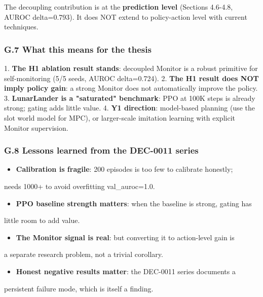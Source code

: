 \documentclass[11pt]{article}
\begin{document}
The decoupling contribution is at the \textbf{prediction level} (Sections 4.6-4.8,
AUROC delta=0.793). It does NOT extend to policy-action level with current
techniques.

\subsubsection{G.7 What this means for the thesis}

1. \textbf{The H1 ablation result stands}: decoupled Monitor is a robust primitive
   for self-monitoring (5/5 seeds, AUROC delta=0.724).
2. \textbf{The H1 result does NOT imply policy gain}: a strong Monitor does not
   automatically improve the policy.
3. \textbf{LunarLander is a "saturated" benchmark}: PPO at 100K steps is already
   strong; gating adds little value.
4. \textbf{Y1 direction}: model-based planning (use the slot world model for MPC),
   or larger-scale imitation learning with explicit Monitor supervision.

\subsubsection{G.8 Lessons learned from the DEC-0011 series}

\begin{itemize}
  \item \textbf{Calibration is fragile}: 200 episodes is too few to calibrate honestly;
\end{itemize}

  needs 1000+ to avoid overfitting val\_auroc=1.0.
\begin{itemize}
  \item \textbf{PPO baseline strength matters}: when the baseline is strong, gating has
\end{itemize}

  little room to add value.
\begin{itemize}
  \item \textbf{The Monitor signal is real}: but converting it to action-level gain is
\end{itemize}

  a separate research problem, not a trivial corollary.
\begin{itemize}
  \item \textbf{Honest negative results matter}: the DEC-0011 series documents a
\end{itemize}

  persistent failure mode, which is itself a finding.
\end{document}
